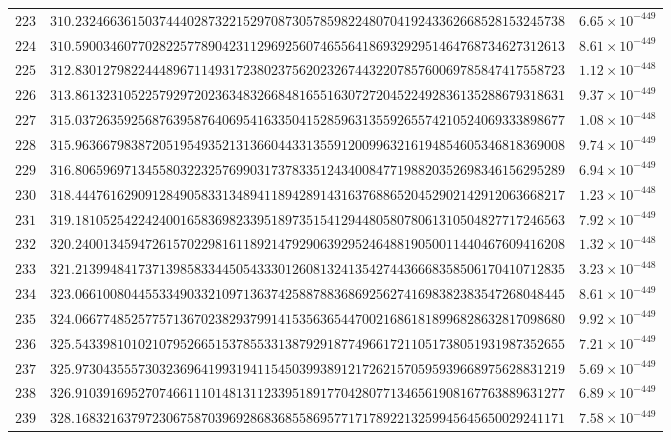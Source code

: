 \documentclass[12pt,reqno]{amsart}
\theoremstyle{remark}
\begin{document}
\begin{longtable}{clc}
$223$ & $310.2324663615037444028732215297087305785982248070419243362668528153245738$ & $6.65\times 10^{-449}$ \\
$224$ & $310.5900346077028225778904231129692560746556418693292951464768734627312613$ & $8.61\times 10^{-449}$ \\
$225$ & $312.8301279822444896711493172380237562023267443220785760069785847417558723$ & $1.12\times 10^{-448}$ \\
$226$ & $313.8613231052257929720236348326684816551630727204522492836135288679318631$ & $9.37\times 10^{-449}$ \\
$227$ & $315.0372635925687639587640695416335041528596313559265574210524069333898677$ & $1.08\times 10^{-448}$ \\
$228$ & $315.9636679838720519549352131366044331355912009963216194854605346818369008$ & $9.74\times 10^{-449}$ \\
$229$ & $316.8065969713455803223257699031737833512434008477198820352698346156295289$ & $6.94\times 10^{-449}$ \\
$230$ & $318.4447616290912849058331348941189428914316376886520452902142912063668217$ & $1.23\times 10^{-448}$ \\
$231$ & $319.1810525422424001658369823395189735154129448058078061310504827717246563$ & $7.92\times 10^{-449}$ \\
$232$ & $320.2400134594726157022981611892147929063929524648819050011440467609416208$ & $1.32\times 10^{-448}$ \\
$233$ & $321.2139948417371398583344505433301260813241354274436668358506170410712835$ & $3.23\times 10^{-448}$ \\
$234$ & $323.0661008044553349033210971363742588788368692562741698382383547268048445$ & $8.61\times 10^{-449}$ \\
$235$ & $324.0667748525775713670238293799141535636544700216861818996828632817098680$ & $9.92\times 10^{-449}$ \\
$236$ & $325.5433981010210795266515378553313879291877496617211051738051931987352655$ & $7.21\times 10^{-449}$ \\
$237$ & $325.9730435557303236964199319411545039938912172621570595939668975628831219$ & $5.69\times 10^{-449}$ \\
$238$ & $326.9103916952707466111014813112339518917704280771346561908167763889631277$ & $6.89\times 10^{-449}$ \\
$239$ & $328.1683216379723067587039692868368558695771717892213259945645650029241171$ & $7.58\times 10^{-449}$ \\

\end{longtable}
\end{document}
